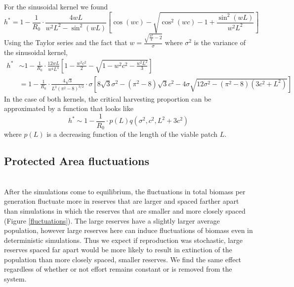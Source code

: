 \documentclass[12pt,english]{article}
\begin{document}
For the sinusoidal kernel we found 
\begin{equation}
h^*=1-\frac{1}{R_0}\cdot\frac{4wL}{w^2L^2-\sin^2(wL)}\left[\cos(wc)-\sqrt{\cos^2(wc)-1+\frac{\sin^2(wL)}{w^2L^2}}\right] 
\end{equation} 
Using the Taylor series and the fact that $w=\frac{\sqrt{\frac{\pi^2}{4}-2}}{\sigma}$ where $\sigma^2$ is the variance of the sinusoidal kernel,
\begin{align*}
h^*&\sim 1-\frac{1}{R_0}\cdot\frac{12wL}{w^4L^4}\left[1-\frac{w^2c^2}{2}-\sqrt{1-w^2c^2-\frac{w^2L^2}{3}}\right]
\\&=1-\frac{1}{R_0}\cdot\frac{4\sqrt{3}}{L^3(\pi^2-8)^{3/2}}\cdot\sigma\left[8\sqrt{3}\sigma^2-(\pi^2-8)\sqrt{3}c^2-4\sigma\sqrt{12\sigma^2-(\pi^2-8)(3c^2+L^2)}\right]
\end{align*}
In the case of both kernels, the critical harvesting proportion can be approximated by a function that looks like 
\begin{equation}
h^*\sim1- \frac{1}{R_0}\cdot p(L)q(\sigma^2,c^2,L^2+3c^2)
\end{equation}
where $p(L)$ is a decreasing function of the length of the viable patch $L$.

\subsection{Protected Area fluctuations \label{MPA}}
~\\After the simulations come to equilibrium, the fluctuations in total biomass per generation fluctuate more in reserves that are larger and spaced farther apart than simulations in which the reserves that are smaller and more closely spaced (Figure \ref{fluctuations}). The large reserves have a slightly larger average population, however large reserves here can induce fluctuations of biomass even in deterministic simulations. Thus we expect if reproduction was stochastic, large reserves spaced far apart would be more likely to result in extinction of the population than more closely spaced, smaller reserves. We find the same effect regardless of whether or not effort remains constant or is removed from the system. 
\end{document}
